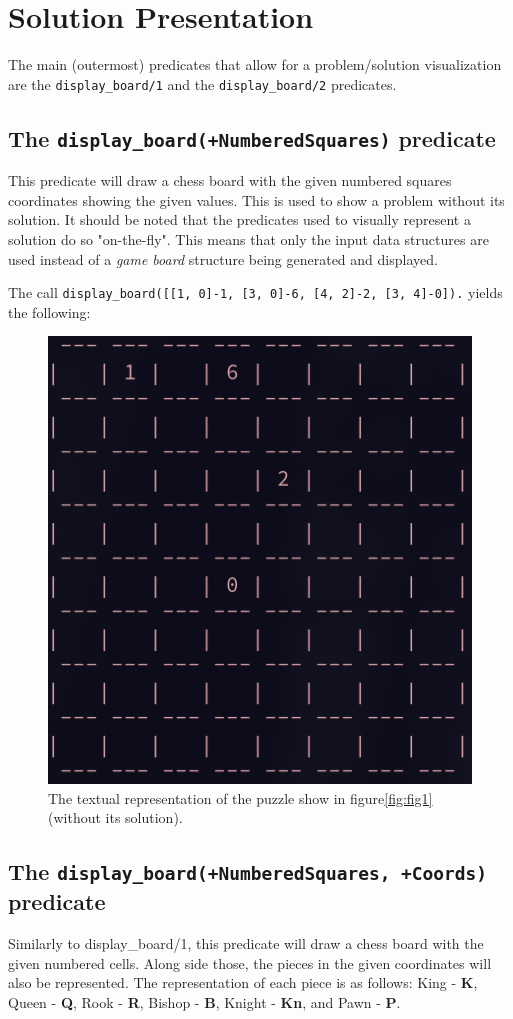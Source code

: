 \documentclass[runningheads]{llncs}
\newcommand{\inlinecode}[1]{\texttt{#1}}
\begin{document}
\section{Solution Presentation}

The main (outermost) predicates that allow for a problem/solution visualization
are the \inlinecode{display\_board/1} and the \inlinecode{display\_board/2} predicates.

\subsection{The \inlinecode{display\_board(+NumberedSquares)} predicate}

This predicate will draw a chess board with the given numbered squares coordinates
showing the given values. This is used to show a problem without its solution. It
should be noted that the predicates used to visually represent a solution do so
"on-the-fly". This means that only the input data structures are used instead of
a \textit{game board} structure being generated and displayed.

The call \inlinecode{display\_board([[1, 0]-1, [3, 0]-6, [4, 2]-2, [3, 4]-0]).}
yields the following:
\begin{figure}[H]
  \centering
  \includegraphics[width=0.5\linewidth]{figures/display_board_1.png}
  \caption{The textual representation of the puzzle show in figure\ref{fig:fig1}
  (without its solution).}\label{fig:fig2}
\end{figure}

\subsection{The \inlinecode{display\_board(+NumberedSquares, +Coords)} predicate}

Similarly to display\_board/1, this predicate will draw a chess board with the given
numbered cells. Along side those, the pieces in the given coordinates will also be
represented. The representation of each piece is as follows: King - \textbf{K},
Queen - \textbf{Q}, Rook - \textbf{R}, Bishop - \textbf{B}, Knight - \textbf{Kn},
and Pawn - \textbf{P}.
\end{document}
